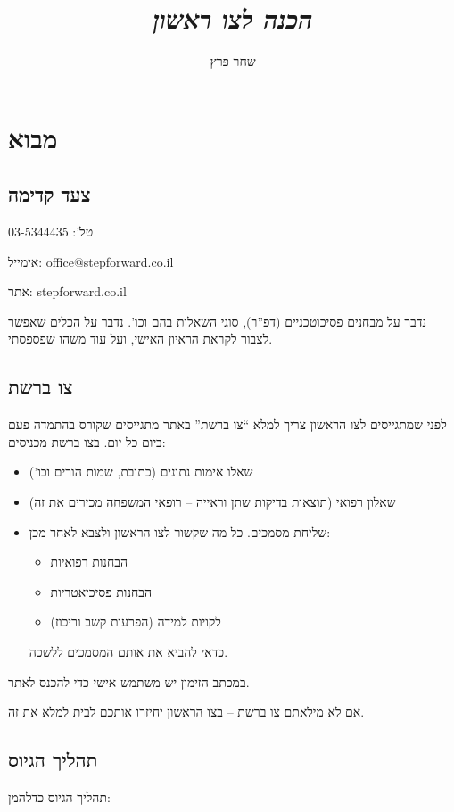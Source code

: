 \documentclass[]{article}
\author{שחר פרץ}
\title{\textit{הכנה לצו ראשון}}
\begin{document}
	\maketitle
	
	\section{מבוא}
	
	\subsection*{צעד קדימה}
	טל': 03-5344435
	
	אימייל: office@stepforward.co.il
	
	אתר: stepforward.co.il
	
	נדבר על מבחנים פסיכוטכניים (דפ''ר), סוגי השאלות בהם וכו'. נדבר על הכלים שאפשר לצבור לקראת הראיון האישי, ועל עוד משהו שפספסתי. 
	
	\subsection*{צו ברשת}
	
	לפני שמתגייסים לצו הראשון צריך למלא ``צו ברשת'' באתר מתגייסים שקורס בהתמדה פעם ביום כל יום. בצו ברשת מכניסים: 
	\begin{itemize}
		\item שאלו אימות נתונים (כתובת, שמות הורים וכו')
		\item שאלון רפואי (תוצאות בדיקות שתן וראייה – רופאי המשפחה מכירים את זה)
		\item שליחת מסמכים. כל מה שקשור לצו הראשון ולצבא לאחר מכן: 
		\begin{itemize}
			\item הבחנות רפואיות
			\item הבחנות פסיכיאטריות
			\item לקויות למידה (הפרעות קשב וריכוז)
		\end{itemize}
		כדאי להביא את אותם המסמכים ללשכה. 
	\end{itemize}
	במכתב הזימון יש משתמש אישי כדי להכנס לאתר. 
	
	אם לא מילאתם צו ברשת – בצו הראשון יחיזרו אותכם לבית למלא את זה. 
	
	\subsection*{תהליך הגיוס}
	תהליך הגיוס כדלהמן: 
	
\end{document}
